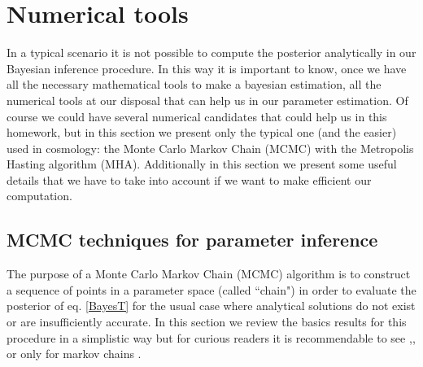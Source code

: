 \documentclass[onecolumn,           %
               showpacs,            %
               preprintnumbers,     %
               aps,                 %
               prl,          	    %
               letterpaper,             %
               superscriptaddress,      %
               nofootinbib,         %
               tightenlines,        %
               floats,floatfix      %
               ,usenatbib,
               ]{revtex4-1}
\begin{document}

%

\section{Numerical tools}

In a typical scenario it is not possible to compute the posterior analytically in our Bayesian inference procedure. In this way it is important to know, once we have all the necessary mathematical tools to make a bayesian estimation, all the numerical tools at our disposal that can help us in our parameter estimation. Of course we could have several numerical candidates that could help us in this homework, but in this section we present only the typical one (and the easier) used in cosmology: the Monte Carlo Markov Chain (MCMC) with the Metropolis Hasting algorithm (MHA). Additionally in this section we present some useful details that we have to take into account if we want to make efficient our computation. 

\subsection{MCMC techniques for parameter inference}

The purpose of a Monte Carlo Markov Chain (MCMC) algorithm is to construct a sequence of points in a parameter space (called ``chain") in order to evaluate the posterior of eq. \eqref{BayesT} for the usual case where analytical solutions do not exist or are insufficiently accurate. In this section we review the basics results for this procedure in a simplistic way but for curious readers it is recommendable to see \cite{mcmc1},\cite{mcmc2}, \cite{mcmc3} or only for markov chains \cite{mcmc4}.
\end{document}
